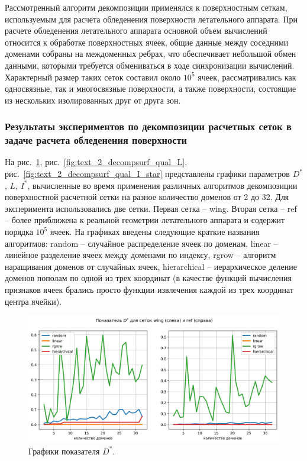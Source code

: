 Рассмотренный алгоритм декомпозиции применялся к поверхностным сеткам, используемым для расчета обледенения поверхности летательного аппарата.
При расчете обледенения летательного аппарата основной объем вычислений относится к обработке поверхностных ячеек, общие данные между соседними доменами собраны на междоменных ребрах, что обеспечивает небольшой обмен данными, которыми требуется обмениваться в ходе синхронизации вычислений.
Характерный размер таких сеток составил около $10^5$ ячеек, рассматривались как односвязные, так и многосвязные поверхности, а также поверхности, состоящие из нескольких изолированных друг от друга зон.

\subsubsection{Результаты экспериментов по декомпозиции расчетных сеток в задаче расчета обледенения поверхности}

На рис.~\ref{fig:text_2_decompsurf_qual_D_star}, рис.~\ref{fig:text_2_decompsurf_qual_L}, рис.~\ref{fig:text_2_decompsurf_qual_I_star} представлены графики параметров $D^{*}$, $L$, $I^{*}$, вычисленные во время применения различных алгоритмов декомпозиции поверхностной расчетной сетки на разное количество доменов от 2 до 32.
Для эксперимента использовались две сетки.
Первая сетка -- wing.
Вторая сетка -- ref -- более приближена к реальной геометрии летательного аппарата и содержит порядка $10^5$ ячеек.
На графиках введены следующие краткие названия алгоритмов: random -- случайное распределение ячеек по доменам, linear -- линейное разделение ячеек между доменами по индексу, rgrow -- алгоритм наращивания доменов от случайных ячеек, hierarchical -- иерархическое деление доменов пополам по одной из трех координат (в качестве функций вычисления признаков ячеек брались просто функции извлечения каждой из трех координат центра ячейки).

\begin{figure}[h]
	\centering
	\includegraphics[width=1.0\textwidth]{./pics/text_2_decompsurf/qual_D_star.png}
	\caption{Графики показателя $D^{*}$.}
	\label{fig:text_2_decompsurf_qual_D_star}
\end{figure}


